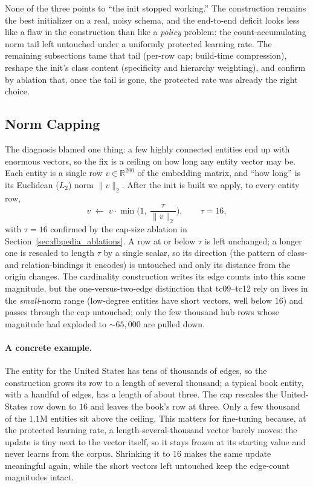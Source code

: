 \documentclass[a4paper,oneside,bibliography=totoc]{scrbook}
\begin{document}
None of the three points to ``the init stopped working.'' The construction
remains the best initializer on a real, noisy schema, and the end-to-end deficit
looks less like a flaw in the construction than like a \emph{policy} problem: the
count-accumulating norm tail left untouched under a uniformly protected learning
rate. The remaining subsections tame that tail (per-row cap;
build-time compression), reshape the init's class content (specificity and
hierarchy weighting), and confirm by ablation that, once the tail is gone, the
protected rate was already the right choice.

\subsection{Norm Capping}
\label{sec:dbpedia_cap}

The diagnosis blamed one thing: a few highly connected entities end up with
enormous vectors, so the fix is a ceiling on how long any entity vector may be.
Each entity is a single row $v \in \mathbb{R}^{200}$ of the embedding matrix, and
``how long'' is its Euclidean ($L_2$) norm $\lVert v \rVert_2$. After the init is
built we apply, to every entity row,
\begin{equation*}
  v \;\leftarrow\; v \cdot \min\!\Big(1,\ \frac{\tau}{\lVert v \rVert_2}\Big),
  \qquad \tau = 16 ,
\end{equation*}
with $\tau = 16$ confirmed by the cap-size ablation in
Section~\ref{sec:dbpedia_ablations}. A row at or below $\tau$ is left unchanged; a
longer one is rescaled to length $\tau$ by a single scalar, so its direction (the
pattern of class- and relation-bindings it encodes) is untouched and only its
distance from the origin changes. The cardinality construction writes its edge
counts into this same magnitude, but the one-versus-two-edge distinction that
tc09--tc12 rely on lives in the \emph{small}-norm range (low-degree entities have
short vectors, well below $16$) and passes through the cap untouched; only the few
thousand hub rows whose magnitude had exploded to $\sim\!65{,}000$ are pulled down.

\paragraph{A concrete example.} The entity for the United States has tens of
thousands of edges, so the construction grows its row to a length of several
thousand; a typical book entity, with a handful of edges, has a length of about
three. The cap rescales the United-States row down to $16$ and leaves the book's
row at three. Only a few thousand of the $1.1$M entities sit above the ceiling.
This matters for fine-tuning because, at the protected learning rate, a
length-several-thousand vector barely moves: the update is tiny next to the
vector itself, so it stays frozen at its starting value and never learns from the
corpus. Shrinking it to $16$ makes the same update meaningful again, while the
short vectors left untouched keep the edge-count magnitudes intact.
\end{document}
